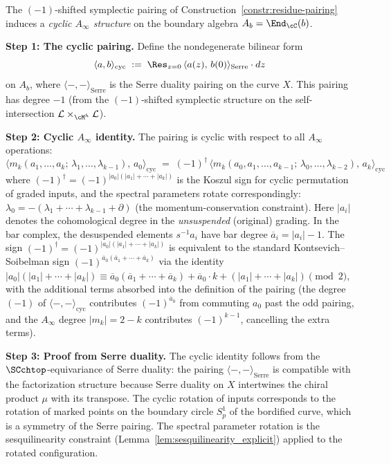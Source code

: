 \begin{construction}
\label{constr:cyclic-structure}
The $(-1)$-shifted symplectic pairing of Construction~\ref{constr:residue-pairing} induces a \emph{cyclic $A_\infty$ structure} on the boundary algebra $A_b = \End_\cC(b)$.

\textbf{Step 1: The cyclic pairing.} Define the nondegenerate bilinear form
\[
\langle a, b \rangle_{\mathrm{cyc}} \;:=\; \Res_{z=0}\, \langle a(z),\, b(0) \rangle_{\mathrm{Serre}} \cdot dz
\]
on $A_b$, where $\langle -,- \rangle_{\mathrm{Serre}}$ is the Serre duality pairing on the curve $X$. This pairing has degree $-1$ (from the $(-1)$-shifted symplectic structure on the self-intersection $\cL \times_{\cM^h} \cL$).

\textbf{Step 2: Cyclic $A_\infty$ identity.} The pairing is cyclic with respect to all $A_\infty$ operations:
\begin{equation}\label{eq:cyclic-Ainfty}
\langle m_k(a_1, \ldots, a_k;\, \lambda_1, \ldots, \lambda_{k-1}),\, a_0 \rangle_{\mathrm{cyc}} \;=\; (-1)^{\dagger}\, \langle m_k(a_0, a_1, \ldots, a_{k-1};\, \lambda_0, \ldots, \lambda_{k-2}),\, a_k \rangle_{\mathrm{cyc}}
\end{equation}
where $(-1)^\dagger = (-1)^{|a_0|(|a_1|+\cdots+|a_k|)}$ is the Koszul sign for cyclic permutation of graded inputs, and the spectral parameters rotate correspondingly: $\lambda_0 = -(\lambda_1 + \cdots + \lambda_{k-1} + \partial)$ (the momentum-conservation constraint). Here $|a_i|$ denotes the cohomological degree in the \emph{unsuspended} (original) grading. In the bar complex, the desuspended elements $s^{-1}a_i$ have bar degree $\overline{a}_i = |a_i| - 1$. The sign $(-1)^\dagger = (-1)^{|a_0|(|a_1|+\cdots+|a_k|)}$ is equivalent to the standard Kontsevich--Soibelman sign $(-1)^{\overline{a}_0(\overline{a}_1+\cdots+\overline{a}_k)}$ via the identity $|a_0|(|a_1|+\cdots+|a_k|) \equiv \overline{a}_0(\overline{a}_1+\cdots+\overline{a}_k) + \overline{a}_0 \cdot k + (|a_1|+\cdots+|a_k|) \pmod{2}$, with the additional terms absorbed into the definition of the pairing (the degree $(-1)$ of $\langle -,- \rangle_{\mathrm{cyc}}$ contributes $(-1)^{\overline{a}_0}$ from commuting $a_0$ past the odd pairing, and the $A_\infty$ degree $|m_k| = 2-k$ contributes $(-1)^{k-1}$, cancelling the extra terms).

\textbf{Step 3: Proof from Serre duality.} The cyclic identity follows from the $\SCchtop$-equivariance of Serre duality: the pairing $\langle -,- \rangle_{\mathrm{Serre}}$ is compatible with the factorization structure because Serre duality on $X$ intertwines the chiral product $\mu$ with its transpose. The cyclic rotation of inputs corresponds to the rotation of marked points on the boundary circle $S^1_p$ of the bordified curve, which is a symmetry of the Serre pairing. The spectral parameter rotation is the sesquilinearity constraint (Lemma~\ref{lem:sesquilinearity_explicit}) applied to the rotated configuration.


\end{construction}
